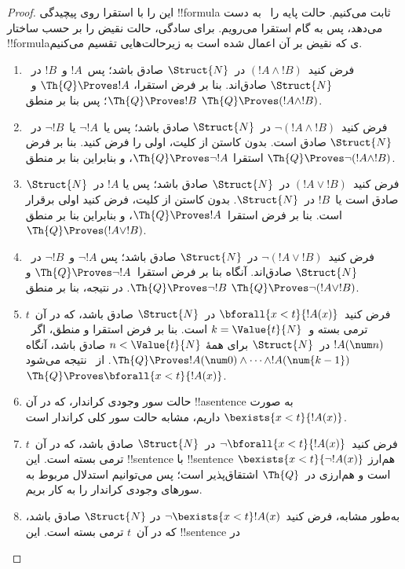 \documentclass[../../../include/open-logic-section]{subfiles}
\begin{document}
\begin{proof}
این را با استقرا روی پیچیدگی !!{formula} ثابت می‌کنیم.
%
حالت پایه را~ به دست می‌دهد، پس به
گام استقرا می‌رویم. برای سادگی، حالت نقیض را بر حسب ساختار
!!{formula}ی که نقیض بر آن اعمال شده است به زیرحالت‌هایی تقسیم می‌کنیم.

\begin{enumerate}
\item فرض کنید~$(!A \land !B)$ در~$\Struct{N}$ صادق باشد؛ پس~$!A$
و~$!B$ در~$\Struct{N}$ صادق‌اند. بنا بر فرض استقرا،
$\Th{Q} \Proves !A$ و~$\Th{Q} \Proves !B$؛ پس بنا بر منطق
$\Th{Q} \Proves (!A \land !B)$.
%
\item فرض کنید~$\lnot (!A \land !B)$ در~$\Struct{N}$ صادق باشد؛
پس یا~$\lnot !A$ یا~$\lnot !B$ در~$\Struct{N}$ صادق است. بدون کاستن
از کلیت، اولی را فرض کنید. بنا بر فرض استقرا
$\Th{Q} \Proves \lnot !A$، و بنابراین بنا بر منطق
$\Th{Q} \Proves \lnot (!A \land !B)$.
%
\item فرض کنید~$(!A \lor !B)$ در~$\Struct{N}$ صادق باشد؛ پس یا
$!A$ در~$\Struct{N}$ صادق است یا~$!B$ در~$\Struct{N}$. بدون کاستن از کلیت، فرض کنید
اولی برقرار است. بنا بر فرض استقرا~$\Th{Q} \Proves !A$، و بنابراین
بنا بر منطق~$\Th{Q} \Proves (!A \lor !B)$.
%
\item فرض کنید~$\lnot(!A \lor !B)$ در~$\Struct{N}$ صادق باشد؛ پس
$\lnot !A$ و~$\lnot !B$ در~$\Struct{N}$ صادق‌اند. آنگاه بنا بر فرض
استقرا~$\Th{Q} \Proves \lnot !A$ و
$\Th{Q} \Proves \lnot !B$. در نتیجه، بنا بر منطق
$\Th{Q} \Proves \lnot(!A \lor !B)$.
%
\item فرض کنید~$\bforall{x<t}{!A(x)}$ در~$\Struct{N}$ صادق باشد،
که در آن~$t$ ترمی بسته و~$k=\Value{t}{N}$ است. بنا بر فرض استقرا و
منطق، اگر~$!A(\num n)$ در~$\Struct{N}$ برای همهٔ
$n < \Value{t}{N}$ صادق باشد، آنگاه
$\Th{Q} \Proves !A(\num 0) \land \dots \land !A(\num{k-1})$.
از~ نتیجه می‌شود
$\Th{Q} \Proves \bforall{x<t}{!A(x)}$.
%
\item حالت سور وجودی کراندار، که در آن !!a{sentence} به صورت
$\bexists{x < t}{!A(x)}$ داریم، مشابه حالت سور کلی کراندار است.
%
\item فرض کنید~$\lnot \bforall{x<t}{!A(x)}$ در~$\Struct{N}$ صادق
باشد، که در آن~$t$ ترمی بسته است. این !!{sentence} با !!{sentence}ٔ
$\bexists{x<t}{\lnot !A(x)}$ هم‌ارز است و هم‌ارزی در~$\Th{Q}$
اشتقاق‌پذیر است؛ پس می‌توانیم استدلال مربوط به سورهای وجودی کراندار را
به کار بریم.
%
\item به‌طور مشابه، فرض کنید~$\lnot \bexists{x<t}!A(x)$ در
$\Struct{N}$ صادق باشد، که در آن~$t$ ترمی بسته است. این !!{sentence} در

\end{enumerate}
\end{proof}
\end{document}
